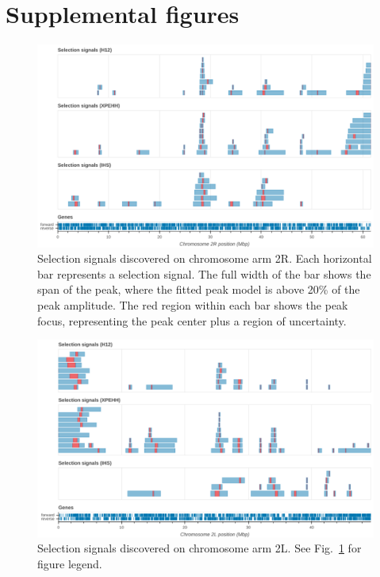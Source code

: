\documentclass[a4paper,11pt,abstracton,hidelinks]{scrartcl}
\begin{document}
\section{Supplemental figures}\label{sec:supplemental-figures}


\begin{figure}[h!]
\centering
\includegraphics[width=1.1\textwidth,center]{artwork/chapter5/signals_2R.png}
\caption{Selection signals discovered on chromosome arm 2R.
%
Each horizontal bar represents a selection signal.
%
The full width of the bar shows the span of the peak, where the fitted peak model is above 20\% of the peak amplitude.
%
The red region within each bar shows the peak focus, representing the peak center plus a region of uncertainty.
%
}
\label{fig:signals_2R}
\end{figure}


\clearpage
\begin{figure}[h!]
\centering
\includegraphics[width=1.1\textwidth,center]{artwork/chapter5/signals_2L.png}
\caption{Selection signals discovered on chromosome arm 2L.
%
See Fig.~\ref{fig:signals_2R} for figure legend.
}
\label{fig:signals_2L}
\end{figure}
\end{document}
